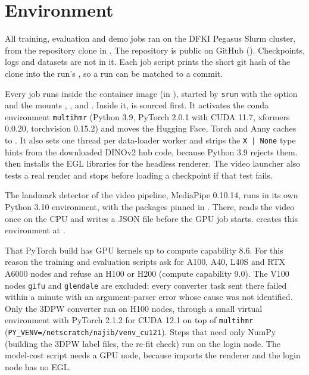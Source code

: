 

\section{Environment}
\label{sec:app-env}

All training, evaluation and demo jobs ran on the DFKI Pegasus Slurm cluster, from the repository clone in
. The repository is public on GitHub
().
Checkpoints, logs and datasets are not in it. Each job script prints the short git hash of the clone into the run's
, so a run can be matched to a commit.

Every job runs inside the container image  (in ),
started by \texttt{srun} with the option  and the mounts , ,
 and . Inside it,  is sourced first. It activates the conda
environment \texttt{multihmr} (Python 3.9, PyTorch 2.0.1 with CUDA 11.7, xformers 0.0.20, torchvision 0.15.2) and
moves the Hugging Face, Torch and Anny caches to . It also sets one thread per data-loader
worker and strips the \texttt{X | None} type hints from the downloaded DINOv2 hub code, because Python 3.9 rejects
them.  then installs the EGL libraries for the headless renderer. The video launcher also tests a
real render and stops before loading a checkpoint if that test fails.

The landmark detector of the video pipeline, MediaPipe 0.10.14, runs in its own Python 3.10 environment, with the
packages pinned in . There,  reads
the video once on the CPU and writes a JSON file before the GPU job starts.  creates this environment at
.

That PyTorch build has GPU kernels up to compute capability 8.6. For this reason the training and evaluation scripts
ask for A100, A40, L40S and RTX A6000 nodes and refuse an H100 or H200 (compute capability 9.0). The V100 nodes
\texttt{gifu} and \texttt{glendale} are excluded: every converter task sent there failed within a minute with an
argument-parser error whose cause was not identified. Only the 3DPW converter ran on H100 nodes, through a small virtual
environment with PyTorch 2.1.2 for CUDA 12.1 on top of \texttt{multihmr}
(\texttt{PY\_VENV=/netscratch/najib/venv\_cu121}). Steps that need only NumPy (building the 3DPW label files, the re-fit
check) run on the login node. The model-cost script needs a GPU node, because  imports the renderer and
the login node has no EGL.

